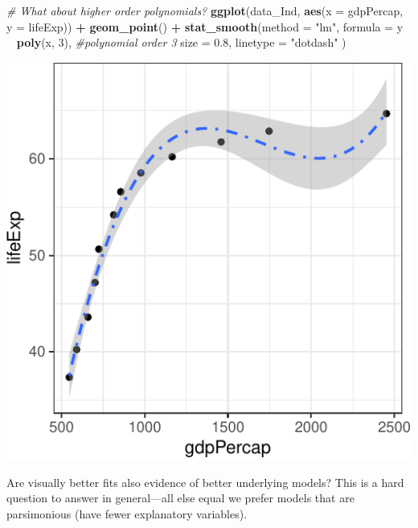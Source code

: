 \documentclass[12pt,]{article}
\newenvironment{Shaded}{\begin{snugshade}}{\end{snugshade}}
\newcommand{\KeywordTok}[1]{\textcolor[rgb]{0.13,0.29,0.53}{\textbf{#1}}}
\newcommand{\DataTypeTok}[1]{\textcolor[rgb]{0.13,0.29,0.53}{#1}}
\newcommand{\DecValTok}[1]{\textcolor[rgb]{0.00,0.00,0.81}{#1}}
\newcommand{\FloatTok}[1]{\textcolor[rgb]{0.00,0.00,0.81}{#1}}
\newcommand{\StringTok}[1]{\textcolor[rgb]{0.31,0.60,0.02}{#1}}
\newcommand{\CommentTok}[1]{\textcolor[rgb]{0.56,0.35,0.01}{\textit{#1}}}
\newcommand{\OperatorTok}[1]{\textcolor[rgb]{0.81,0.36,0.00}{\textbf{#1}}}
\newcommand{\NormalTok}[1]{#1}
\begin{document}
\begin{Shaded}
\begin{Highlighting}[]
\CommentTok{# What about higher order polynomials?}
\KeywordTok{ggplot}\NormalTok{(data_Ind, }\KeywordTok{aes}\NormalTok{(}\DataTypeTok{x =}\NormalTok{ gdpPercap, }\DataTypeTok{y =}\NormalTok{ lifeExp)) }\OperatorTok{+}
\StringTok{  }\KeywordTok{geom_point}\NormalTok{() }\OperatorTok{+}
\StringTok{  }\KeywordTok{stat_smooth}\NormalTok{(}\DataTypeTok{method =} \StringTok{"lm"}\NormalTok{, }
              \DataTypeTok{formula =}\NormalTok{ y }\OperatorTok{~}\StringTok{ }\KeywordTok{poly}\NormalTok{(x, }\DecValTok{3}\NormalTok{), }\CommentTok{#polynomial order 3}
              \DataTypeTok{size =} \FloatTok{0.8}\NormalTok{,}
              \DataTypeTok{linetype =} \StringTok{"dotdash"}
\NormalTok{              )}
\end{Highlighting}
\end{Shaded}

\begin{center}\includegraphics{Intro_tips_tricks_files/figure-latex/data_Ind_lm_quad-2} \end{center}

Are visually better fits also evidence of better underlying models? This
is a hard question to answer in general---all else equal we prefer
models that are parsimonious (have fewer explanatory variables).
\end{document}
